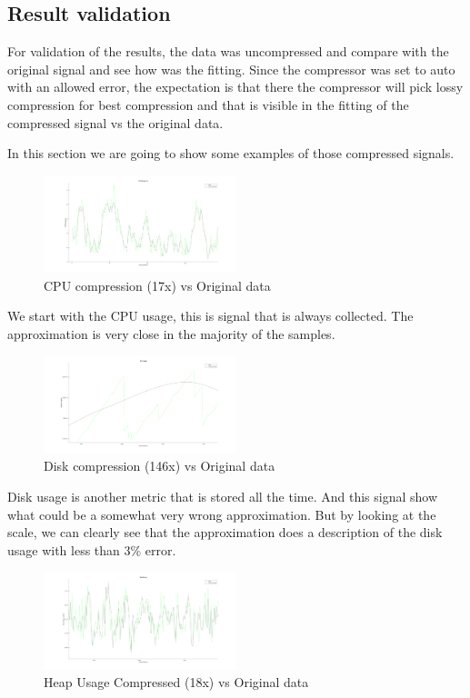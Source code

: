 \documentclass[conference]{IEEEtran}
\begin{document}
\subsection{Result validation}

For validation of the results, the data was uncompressed and compare with the original signal and see how was the fitting. Since the compressor was set to auto with an allowed error, the expectation is that there the compressor will pick lossy compression for best compression and that is visible in the fitting of the compressed signal vs the original data.

In this section we are going to show some examples of those compressed signals.

\begin{figure}[h]
  \centering
  \includegraphics[width=0.5\textwidth]{cpu-usage-validation.png}
  \caption{CPU compression (17x) vs Original data}
  \label{cpu}
\end{figure}

We start with the CPU usage, this is signal that is always collected. 
The approximation is very close in the majority of the samples. 

\begin{figure}[h]
    \centering
    \includegraphics[width=0.5\textwidth]{disk-usage-validation.png}
    \caption{Disk compression (146x) vs Original data}
    \label{Disk}
  \end{figure}

Disk usage is another metric that is stored all the time.
And this signal show what could be a somewhat very wrong approximation.
But by looking at the scale, we can clearly see that the approximation does a description of the disk usage with less than 3\% error.

  \begin{figure}[h]
    \centering
    \includegraphics[width=0.5\textwidth]{heap-usage-validation.png}
    \caption{Heap Usage Compressed (18x) vs Original data}
    \label{heap}
  \end{figure}
\vspace{10pt}
\end{document}

